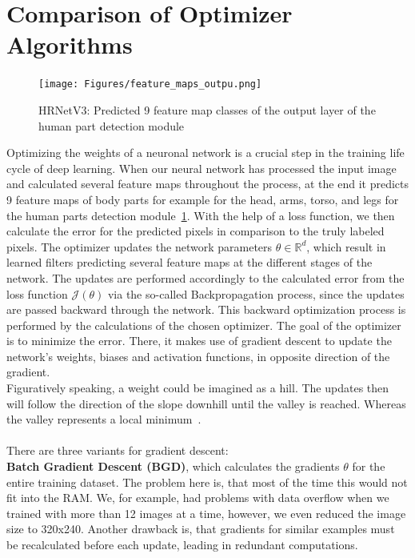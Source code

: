 \section{Comparison of Optimizer Algorithms}
\label{optimizers}
\begin{figure}[H]
    \centering
    \texttt{[image: Figures/feature\_maps\_outpu.png]}
    \decoRule
    \caption[HRNetV3: Prediceted Feature Maps]{HRNetV3: Predicted 9 feature map classes of the output layer of the
    human part detection module}
    \label{fig:feature-maps-output}
\end{figure}
Optimizing the weights of a neuronal network is a crucial step in the training life cycle of deep learning.
When our neural network has processed the input image and calculated several feature maps throughout the process,
at the end it predicts 9 feature maps of body parts for example for the head, arms, torso, and legs for the human parts
detection module~\ref{fig:feature-maps-output}.
With the help of a loss function, we then calculate the error for the predicted pixels in comparison to the truly labeled
pixels.
The optimizer updates the network parameters $\theta \in \mathbb{R}^d$, which result in learned filters predicting several feature maps at
the different stages of the network.
The updates are performed accordingly to the calculated error from the loss function $\mathcal{J}(\theta)$ via the
so-called Backpropagation process, since the updates are passed backward through the network.
This backward optimization process is performed by the calculations of the chosen optimizer.
The goal of the optimizer is to minimize the error.
There, it makes use of gradient descent to update the network's weights, biases and activation functions, in opposite direction
of the gradient.\\
Figuratively speaking, a weight could be imagined as a hill.
The updates then will follow the direction of the slope downhill until the valley is reached.
Whereas the valley represents a local minimum~\cite{optimizersoverview}.
\\\mbox{}\\
There are three variants for gradient descent:\\
\textbf{Batch Gradient Descent (BGD)}, which calculates the gradients $\theta$ for the entire training dataset.
The problem here is, that most of the time this would not fit into the RAM.
We, for example, had problems with data overflow when we trained with more than 12 images at a time, however, we even reduced
the image size to 320x240.
Another drawback is, that gradients for similar examples must be recalculated before each update, leading in redundant computations.\\
